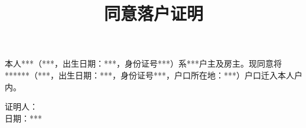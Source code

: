 \documentclass[12pt,a4paper]{article}
\author{}
\title{同意落户证明}
\date{\vspace{-10ex}}
\newcommand{\applicantName}{***}
\newcommand{\applicantSex}{***}
\newcommand{\applicantBirthday}{***}
\newcommand{\applicantIDCardNo}{***}
\newcommand{\applicantResidentAddress}{***}
\newcommand{\personRelation}{***}
\newcommand{\personName}{***}
\newcommand{\personSex}{***}
\newcommand{\personBirthday}{***}
\newcommand{\personIDCardNo}{***}
\newcommand{\personResidentAddress}{***}
\newcommand{\certificateDate}{***}
\begin{document}
\maketitle
\thispagestyle{empty}

本人\applicantName（\applicantSex，出生日期：\applicantBirthday，身份证号\applicantIDCardNo）系\applicantResidentAddress 户主及房主。现同意将\personRelation\personName（\personSex，出生日期：\personBirthday，身份证号\personIDCardNo，户口所在地：\personResidentAddress）户口迁入本人户内。
\begin{flushright}
证明人：　　　　　　\\
日期：\certificateDate
\end{flushright}
\end{document}
